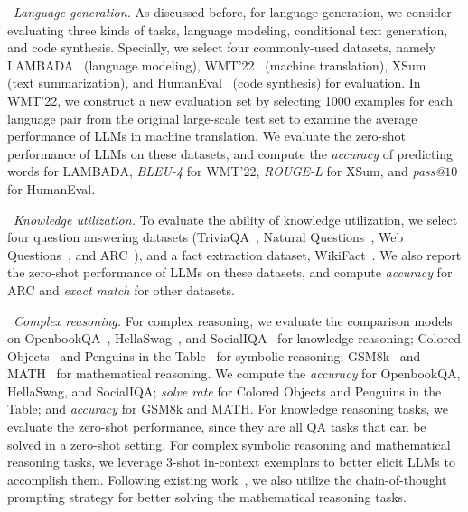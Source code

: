 \textbullet~\emph{Language generation.} As discussed before, for language generation, we consider evaluating three kinds of tasks, \ie language modeling, conditional text generation, and code synthesis. Specially, we select four commonly-used datasets, namely LAMBADA~\cite{Paperno-ACL-2016-LAMBADA} (language modeling), WMT'22~\cite{Kocmi-WMT-2022-Findings} (machine translation), XSum~\cite{Naryan-EMNLP-2018-XSUM} (text summarization), and HumanEval~\cite{Chen-arxiv-2021-evaluating} (code synthesis) for evaluation. 
{
In WMT'22, we construct a new evaluation set by selecting 1000 examples for each language pair from the original large-scale test set to examine the average performance of LLMs in machine translation.}
We evaluate the zero-shot performance of LLMs on these datasets, and compute the \emph{accuracy} of predicting words for LAMBADA, \emph{BLEU-4} for WMT'22, \emph{ROUGE-L} for XSum, and \emph{pass@$10$} for HumanEval.


\textbullet~\emph{Knowledge utilization.} 
To evaluate the ability of knowledge utilization, %
we select four question answering datasets (\ie TriviaQA~\cite{Joshi-ACL-2017-TriviaQA}, Natural Questions~\cite{Kwiatkowski-ACL-2019-Natural}, Web Questions~\cite{Berant-EMNLP-2013-Semantic}, and ARC~\cite{Clark-arxiv-2018-Think}), and a fact extraction dataset, WikiFact~\cite{Goodrich-KDD-2019-Assessing}. 
We also report the zero-shot performance of LLMs on these datasets, {and compute \emph{accuracy} for ARC and \emph{exact match} for other datasets.} 

\textbullet~\emph{Complex reasoning.} %
For complex reasoning, we evaluate the comparison models on OpenbookQA~\cite{Mihaylov-EMNLP-2018-Can}, HellaSwag~\cite{Zellers-acl-2019-HellaSwag}, and SocialIQA~\cite{Sap-arxiv-2019-SocialIQA} for knowledge reasoning; Colored Objects~\cite{Srivastava-arxiv-2022-Beyond} and Penguins in the Table~\cite{Srivastava-arxiv-2022-Beyond} for symbolic reasoning; GSM8k~\cite{Cobbe-arxiv-2021-Training} and MATH~\cite{Hendrycks-ICLR-2021-Measuring} for mathematical reasoning. We compute the \emph{accuracy} for OpenbookQA, HellaSwag, and SocialIQA; \emph{solve rate} for Colored Objects and Penguins in the Table; and \emph{accuracy} for GSM8k and MATH. 
{For knowledge reasoning tasks, we evaluate the zero-shot performance, since they are all QA tasks that can be solved in a zero-shot setting.
For complex symbolic reasoning and mathematical reasoning tasks, we leverage 3-shot in-context exemplars to better elicit LLMs to accomplish them.
Following existing work~\cite{Gao-arxiv-2022-PAL,Wei-arxiv-2022-chain}, we also utilize the chain-of-thought prompting strategy for better solving the mathematical reasoning tasks.}

